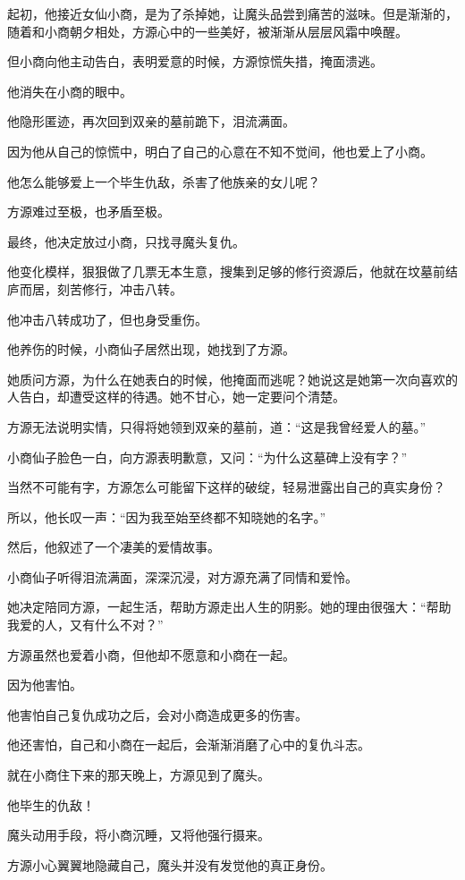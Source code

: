 \begin{this_body}
起初，他接近女仙小商，是为了杀掉她，让魔头品尝到痛苦的滋味。但是渐渐的，随着和小商朝夕相处，方源心中的一些美好，被渐渐从层层风霜中唤醒。

但小商向他主动告白，表明爱意的时候，方源惊慌失措，掩面溃逃。

他消失在小商的眼中。

他隐形匿迹，再次回到双亲的墓前跪下，泪流满面。

因为他从自己的惊慌中，明白了自己的心意在不知不觉间，他也爱上了小商。

他怎么能够爱上一个毕生仇敌，杀害了他族亲的女儿呢？

方源难过至极，也矛盾至极。

最终，他决定放过小商，只找寻魔头复仇。

他变化模样，狠狠做了几票无本生意，搜集到足够的修行资源后，他就在坟墓前结庐而居，刻苦修行，冲击八转。

他冲击八转成功了，但也身受重伤。

他养伤的时候，小商仙子居然出现，她找到了方源。

她质问方源，为什么在她表白的时候，他掩面而逃呢？她说这是她第一次向喜欢的人告白，却遭受这样的待遇。她不甘心，她一定要问个清楚。

方源无法说明实情，只得将她领到双亲的墓前，道：“这是我曾经爱人的墓。”

小商仙子脸色一白，向方源表明歉意，又问：“为什么这墓碑上没有字？”

当然不可能有字，方源怎么可能留下这样的破绽，轻易泄露出自己的真实身份？

所以，他长叹一声：“因为我至始至终都不知晓她的名字。”

然后，他叙述了一个凄美的爱情故事。

小商仙子听得泪流满面，深深沉浸，对方源充满了同情和爱怜。

她决定陪同方源，一起生活，帮助方源走出人生的阴影。她的理由很强大：“帮助我爱的人，又有什么不对？”

方源虽然也爱着小商，但他却不愿意和小商在一起。

因为他害怕。

他害怕自己复仇成功之后，会对小商造成更多的伤害。

他还害怕，自己和小商在一起后，会渐渐消磨了心中的复仇斗志。

就在小商住下来的那天晚上，方源见到了魔头。

他毕生的仇敌！

魔头动用手段，将小商沉睡，又将他强行摄来。

方源小心翼翼地隐藏自己，魔头并没有发觉他的真正身份。


\end{this_body}
